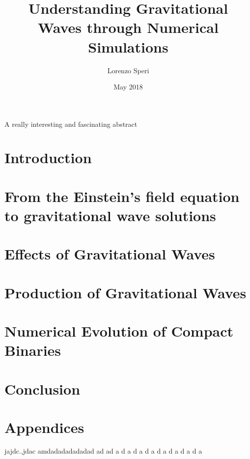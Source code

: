 \documentclass[twoside,english, a4paper, 12pt]{shared/uiofysmaster}
\author{Lorenzo Speri}
\title{\bf{Understanding Gravitational Waves through Numerical Simulations}}
\date{May 2018}
\begin{document}

\maketitle
\clearpage

\tableofcontents
\clearpage

\begin{abstract1}
A really interesting and fascinating abstract
\end{abstract1}

\clearpage
\section{Introduction}


\clearpage
\section{From the Einstein's field equation\\ to gravitational wave solutions}


\clearpage
\section{Effects of Gravitational Waves}


\clearpage
\section{Production of Gravitational Waves}


\clearpage
\section{Numerical Evolution of Compact Binaries}


\clearpage
\section{Conclusion}


\clearpage
\section{Appendices}

jajdc.,jdac amdadadadadadad ad ad a  d a d a d a d a  d a d a d a





\end{document}

